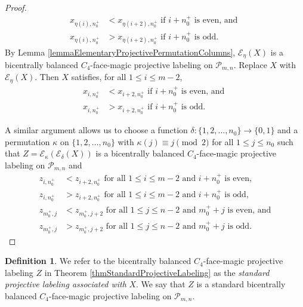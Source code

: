 \documentclass[12pt]{amsart}
\theoremstyle{definition}
\newtheorem{definition}{Definition}
\theoremstyle{plain}
\begin{document}
\begin{proof}
\begin{align*}
    x_{\eta(i),n_0^{+}} &< x_{\eta(i+2),n_0^{+}} \mbox{ \ if }  i+n^{+}_0 \mbox{ is even, and } \\
    x_{\eta(i),n_0^{+}} &> x_{\eta(i+2),n_0^{+}} \mbox{ \ if }  i+n^{+}_0 \mbox{ is odd.}
  \end{align*}
  By Lemma \ref{lemmaElementaryProjectivePermutationColumns},
  $\mathcal{E}_{\eta}(X)$ is a  bicentrally balanced $C_4$-face-magic projective labeling on $\mathcal{P}_{m,n}$.
  Replace $X$ with $\mathcal{E}_{\eta}(X)$. Then $X$ satisfies,
  for all $1 \leqslant i \leqslant m-2$,
  \begin{align*}
    x_{i,n^{+}_0}   &<  x_{i+2,n^{+}_0}  \mbox{ \ if }  i+n^{+}_0 \mbox{ is even, and } \\
     x_{i,n^{+}_0}   &>  x_{i+2,n^{+}_0}  \mbox{ \ if }  i+n^{+}_0 \mbox{ is odd.}
  \end{align*}

  A similar argument allows us to choose a function $\delta:\{1,2,\ldots,n_0\}\rightarrow \{0,1\}$ and a permutation $\kappa$ on $\{1,2,\ldots,n_0\}$
  with $\kappa(j)\equiv j \pmod{2}$ for all $1 \leqslant j \leqslant n_0$
  such that $Z=\mathcal{E}_{\kappa}( \mathcal{E}_{\delta}(X))$
  is a  bicentrally balanced $C_4$-face-magic projective labeling on $\mathcal{P}_{m,n}$ and
  \begin{align*}
    z_{i,n_0^{+}} &<  z_{i+2,n_0^{+}} \mbox{ \ for all } 1 \leqslant i \leqslant m-2 \mbox{ and } i+ n^{+}_0 \mbox{ is even,}  \\
    z_{i,n_0^{+}} &>  z_{i+2,n_0^{+}} \mbox{ \ for all } 1 \leqslant i \leqslant m-2 \mbox{ and } i+ n^{+}_0 \mbox{ is odd,}  \\
    z_{m_0^{+},j} &<  z_{m_0^{+},j+2} \mbox{ \ for all } 1 \leqslant j \leqslant n-2 \mbox{ and } m^{+}_0 +j \mbox{ is even, and} \\
    z_{m_0^{+},j} &>  z_{m_0^{+},j+2} \mbox{ \ for all } 1 \leqslant j \leqslant n-2 \mbox{ and } m^{+}_0 +j \mbox{ is odd.}
  \end{align*}
\end{proof}

\begin{definition}
  We refer to the bicentrally balanced $C_4$-face-magic projective labeling $Z$ in Theorem \ref{thmStandardProjectiveLabeling} as the
  \textit{standard projective labeling associated with} $X$.
  We say that $Z$ is a standard bicentrally balanced $C_4$-face-magic projective labeling on $\mathcal{P}_{m,n}$.
\end{definition}
\end{document}
